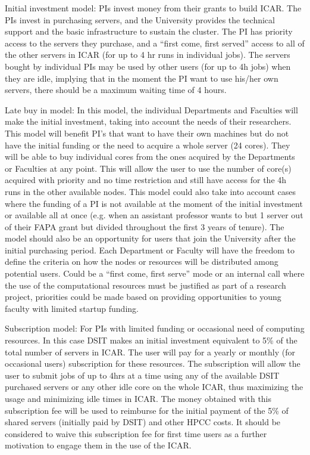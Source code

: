 \documentclass{article}
\begin{document}
Initial investment model: PIs invest money from their grants to build ICAR. The PIs invest in purchasing servers, and the University provides the technical support and the basic infrastructure to sustain the cluster. The PI has priority access to the servers they purchase, and a “first come, first served” access to all of the other servers in ICAR (for up to 4 hr runs in individual jobs). The servers bought by individual PIs may be used by other users (for up to 4h jobs) when they are idle, implying that in the moment the PI want to use his/her own servers, there should be a maximum waiting time of 4 hours.

Late buy in model: In this model, the individual Departments and Faculties will make the initial investment, taking into account the needs of their researchers. This model will benefit PI’s that want to have their own machines but do not have the initial funding or the need to acquire a whole server (24 cores). They will be able to buy individual cores from the ones acquired by the Departments or Faculties at any point. This will allow the user to use the number of core(s) acquired with priority and no time restriction and still have access for the 4h runs in the other available nodes. This model could also take into account cases where the funding of a PI is not available at the moment of the initial investment or available all at once (e.g. when an assistant professor wants to but 1 server out of their FAPA grant but divided throughout the first 3 years of tenure). The model should also be an opportunity for users that join the University after the initial purchasing period. Each Department or Faculty will have the freedom to define the criteria on how the nodes or resources will be distributed among potential users. Could be a “first come, first serve” mode or an internal call where the use of the computational resources must be justified as part of a research project, priorities could be made based on providing opportunities to young faculty with limited startup funding.

Subscription model: For PIs with limited funding or occasional need of computing resources. In this case DSIT makes an initial investment equivalent to 5\% of the total number of servers in ICAR. The user will pay for a yearly or monthly (for occasional users) subscription for these resources. The subscription will allow the user to submit jobs of up to 4hrs at a time using any of the available DSIT purchased servers or any other idle core on the whole ICAR, thus maximizing the usage and minimizing idle times in ICAR. The money obtained with this subscription fee will be used to reimburse for the initial payment of the 5\% of shared servers (initially paid by DSIT) and other HPCC costs. It should be considered to waive this subscription fee for first time users as a further motivation to engage them in the use of the ICAR.
\end{document}
